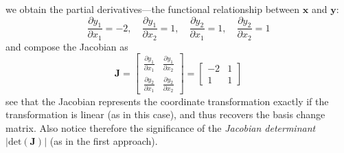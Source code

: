 \documentclass{report}
\begin{document}
we obtain the partial derivatives---the functional relationship between $\bm{x}$ and $\bm{y}$:
\begin{equation*}
\frac{\partial y_1}{\partial x_1}=-2,\quad
\frac{\partial y_1}{\partial x_2}=1,\quad
\frac{\partial y_2}{\partial x_1}=1,\quad
\frac{\partial y_2}{\partial x_2}=1
\end{equation*}
and compose the Jacobian as
\begin{equation*}\bm{J}=
\begin{bmatrix}
\frac{\partial y_1}{\partial x_1}&\frac{\partial y_1}{\partial x_2}\\
\frac{\partial y_2}{\partial x_1}&\frac{\partial y_2}{\partial x_2}\end{bmatrix}=\begin{bmatrix}
-2&1\\1&1\end{bmatrix}
\end{equation*}
see that the Jacobian represents the coordinate transformation exactly if the transformation is linear (as in
this case), and thus recovers the basis change matrix. Also notice therefore
the significance of the \textit{Jacobian determinant} 
$|\text{det}(\bm{J})|$ (as in the first approach).
\newpage
\end{document}
